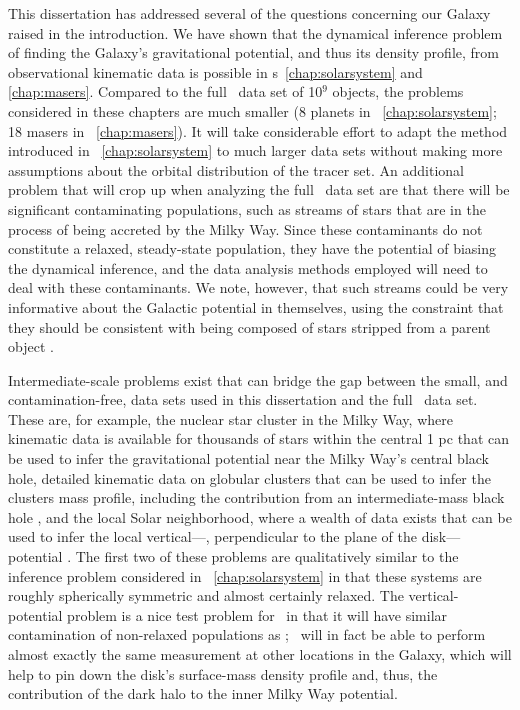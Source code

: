This dissertation has addressed several of the questions concerning
our Galaxy raised in the introduction. We have shown that the
dynamical inference problem of finding the Galaxy's gravitational
potential, and thus its density profile, from observational kinematic
data is possible in \chaptername s~\ref{chap:solarsystem}
and \ref{chap:masers}. Compared to the full \Gaia\ data set of 10$^9$
objects, the problems considered in these chapters are much smaller (8
planets in \chaptername~\ref{chap:solarsystem}; 18 masers
in \chaptername~\ref{chap:masers}). It will take considerable effort
to adapt the method introduced in \chaptername~\ref{chap:solarsystem}
to much larger data sets without making more assumptions about the
orbital distribution of the tracer set. An additional problem that
will crop up when analyzing the full \Gaia\ data set are that there
will be significant contaminating populations, such as streams of
stars that are in the process of being accreted by the Milky
Way. Since these contaminants do not constitute a relaxed,
steady-state population, they have the potential of biasing the
dynamical inference, and the data analysis methods employed will need
to deal with these contaminants. We note, however, that such streams
could be very informative about the Galactic potential in themselves,
using the constraint that they should be consistent with being
composed of stars stripped from a parent
object \citep[\eg,][]{Koposov09a}.

Intermediate-scale problems exist that can bridge the gap between the
small, and contamination-free, data sets used in this dissertation and
the full \Gaia\ data set. These are, for example, the nuclear star
cluster in the Milky Way, where kinematic data is available for
thousands of stars within the central 1 pc \citep{Schoedel09a} that
can be used to infer the gravitational potential near the Milky Way's
central black hole, detailed kinematic data on globular clusters that
can be used to infer the clusters mass profile, including the
contribution from an intermediate-mass black hole \citep{Anderson10a},
and the local Solar neighborhood, where a wealth of data exists that
can be used to infer the local vertical---\ie, perpendicular to the
plane of the disk---potential \citep[\eg, RAVE;][]{Zwitter08a}. The
first two of these problems are qualitatively similar to the inference
problem considered in \chaptername~\ref{chap:solarsystem} in that
these systems are roughly spherically symmetric and almost certainly
relaxed. The vertical-potential problem is a nice test problem
for \Gaia\ in that it will have similar contamination of non-relaxed
populations as \Gaia; \Gaia\ will in fact be able to perform almost
exactly the same measurement at other locations in the Galaxy, which
will help to pin down the disk's surface-mass density profile and,
thus, the contribution of the dark halo to the inner Milky Way
potential.

